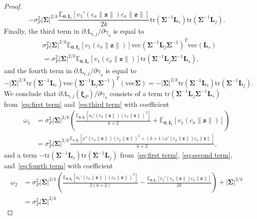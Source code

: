 \documentclass{article}
\numberwithin{equation}{section}
\theoremstyle{plain}
\newcommand{\vc}{\mathrm{vec}}
\newcommand{\bxi}{\bm\xi}
\newcommand{\bgamma}{\bm\gamma}
\newcommand{\bSigma}{\mathbf{\Sigma}}
\newcommand{\bz}{\mathbf{z}}
\newcommand{\bI}{\mathbf{I}}
\newcommand{\bL}{\mathbf{L}}
\newcommand{\E}{\mathbb{E}}
\begin{document}
\begin{proof}
\begin{equation}
-\sigma_P^2
|\bSigma|^{2/k}
\frac{\E_{\mathbf{0},\bI_k}
\left[
v_1'(c_\sigma\|\bz\|)c_\sigma\|\bz\|
\right]}{2k}
\text{tr}\left(\bSigma^{-1}\bL_s\right)
\text{tr}\left(\bSigma^{-1}\bL_j\right).
\end{equation}
Finally, the third term in $\partial\Lambda_{\bgamma,j}/\partial\gamma_s$ is equal to
\begin{equation}
\label{eq:third term}
\begin{split}
&
\sigma_P^2
|\bSigma|^{2/k}
\E_{\mathbf{0},\bI_k}
\left[
v_1(c_\sigma\|\bz\|)
\right]
\vc(\bSigma^{-1}\bL_j\bSigma^{-1})^T
\vc(\bL_s)\\
&=
\sigma_P^2
|\bSigma|^{2/k}
\E_{\mathbf{0},\bI_k}
\left[
v_1(c_\sigma\|\bz\|)
\right]
\text{tr}(\bSigma^{-1}\bL_j\bSigma^{-1}\bL_s),
\end{split}
\end{equation}
and the fourth term in $\partial\Lambda_{\bgamma,j}/\partial\gamma_s$ is equal to
\begin{equation}
\label{eq:fourth term}
-|\bSigma|^{2/k}
\text{tr}
\left(
\bSigma^{-1}\bL_s
\right)
\vc(\bSigma^{-1}\bL_j\bSigma^{-1})^T(\vc\bSigma)
=
-|\bSigma|^{2/k}
\text{tr}
\left(
\bSigma^{-1}\bL_s
\right)
\text{tr}
\left(
\bSigma^{-1}\bL_j
\right).
\end{equation}
We conclude that $\partial\Lambda_{\bgamma,j}(\bxi_P)/\partial \gamma_s$ consists of
a term
$\text{tr}(\bSigma^{-1}\bL_j\bSigma^{-1}\bL_s)$
from~\eqref{eq:first term} and~\eqref{eq:third term}
with coefficient
\[
\begin{split}
\omega_1
&=
\sigma_P^2
|\bSigma|^{2/k}
\left(
\frac{\E_{\mathbf{0},\bI_k}
\left[
u_1'(c_\sigma\|\bz\|)(c_\sigma\|\bz\|)^3
\right]}{k+2}
+
\E_{\mathbf{0},\bI_k}
\left[
v_1(c_\sigma\|\bz\|)
\right]
\right)\\
&=
\sigma_P^2
|\bSigma|^{2/k}
\frac{\mathbb{E}_{0,\mathbf{I}_k}
\left[
\rho''(c_\sigma\|\bz\|)(c_\sigma\|\bz\|)^2+(k+1)\rho'(c_\sigma\|\bz\|)c_\sigma\|\bz\|
\right]}{k+2},
\end{split}
\]
and a term $-\text{tr}(\bSigma^{-1}\bL_s)\text{tr}(\bSigma^{-1}\bL_j)$ 
from~\eqref{eq:first term}, \eqref{eq:second term}, and~\eqref{eq:fourth term}
with coefficient
\[
\begin{split}
\omega_2
&=
\sigma_P^2
|\bSigma|^{2/k}
\left(
\frac{\E_{\mathbf{0},\bI_k}
\left[
u_1'(c_\sigma\|\bz\|)(c_\sigma\|\bz\|)^3
\right]}{2(k+2)}
-
\frac{\E_{\mathbf{0},\bI_k}
\left[
v_1'(c_\sigma\|\bz\|)c_\sigma\|\bz\|
\right]}{2k}
\right)
+
|\bSigma|^{2/k}\\
&=
\sigma_P^2
|\bSigma|^{2/k}

\end{split}\]
\end{proof}
\end{document}
